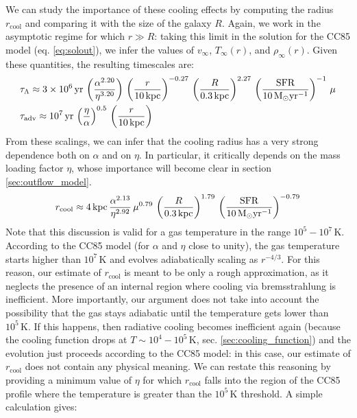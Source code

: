 We can study the importance of these cooling effects by computing the radius $r_\mathrm{cool}$ and comparing it with the size of the galaxy $R$. Again, we work in the asymptotic regime for which $r\gg R$: taking this limit in the solution for the CC85 model (eq. \ref{eq:solout}), we infer the values of $v_\infty$, $T_\infty(r)$, and $\rho_\infty(r)$. Given these quantities, the resulting timescales are: 
\begin{subequations}
\begin{align}
    & \tau_\Lambda \approx 3\times10^6\,\mathrm{yr}\,\left(\frac{\alpha^{2.20}}{\eta^{3.20}}\right)\,\left(\frac{r}{10\,\mathrm{kpc}}\right)^{-0.27}\,\left(\frac{R}{0.3\,\mathrm{kpc}}\right)^{2.27}\,\left(\frac{\mathrm{SFR}}{10\,{\rm M}_{\odot}\mathrm{yr}^{-1}}\right)^{-1}\,\mu \\
    & \tau_\mathrm{adv} \approx 10^7\,\mathrm{yr}\,\left(\frac{\eta}{\alpha}\right)^{0.5}\,\left(\frac{r}{10\,\mathrm{kpc}}\right)
\end{align}
\end{subequations}
From these scalings, we can infer that the cooling radius has a very strong dependence both on $\alpha$ and on $\eta$. In particular, it critically depends on the mass loading factor $\eta$, whose importance will become clear in section \ref{sec:outflow_model}.
\begin{align}
    r_\mathrm{cool} \approx 4\,\mathrm{kpc}\,\frac{\alpha^{2.13}}{\eta^{2.92}}\,\mu^{0.79}\,\left(\frac{R}{0.3\,\mathrm{kpc}}\right)^{1.79}\,\left(\frac{\mathrm{SFR}}{10\,{\rm M}_{\odot}\mathrm{yr}^{-1}}\right)^{-0.79} \label{eq:rcool}
\end{align}
Note that this discussion is valid for a gas temperature in the range $10^5-10^7\,\mathrm{K}$. According to the CC85 model (for $\alpha$ and $\eta$ close to unity), the gas temperature starts higher than $10^7\,\mathrm{K}$ and evolves adiabatically scaling as $r^{-4/3}$. For this reason, our estimate of $r_\mathrm{cool}$ is meant to be only a rough approximation, as it neglects the presence of an internal region where cooling via bremsstrahlung is inefficient. More importantly, our argument does not take into account the possibility that the gas stays adiabatic until the temperature gets lower than $10^5\,\mathrm{K}$. If this happens, then radiative cooling becomes inefficient again (because the cooling function drops at $T\sim10^4-10^5\,\mathrm{K}$, sec. \ref{sec:cooling_function}) and the evolution just proceeds according to the CC85 model: in this case, our estimate of $r_\mathrm{cool}$ does not contain any physical meaning. We can restate this reasoning by providing a minimum value of $\eta$ for which $r_\mathrm{cool}$ falls into the region of the CC85 profile where the temperature is greater than the $10^5\,\mathrm{K}$ threshold. A simple calculation gives:
